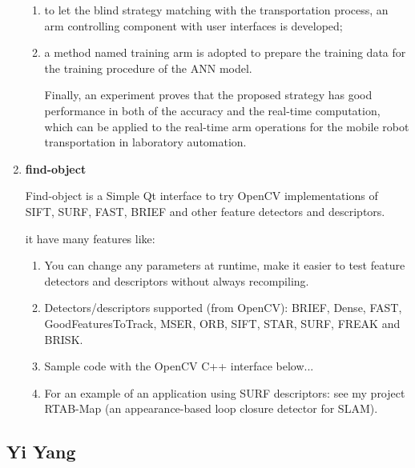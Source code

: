 \documentclass[10pt,twocolumn,letterpaper]{article}
\begin{document}
\begin{enumerate}
\begin{enumerate}
\item to let the blind strategy matching with the transportation process, an arm controlling component with
user interfaces is developed;

\item a method named training arm is adopted to prepare the training data for the training procedure of the ANN model.

Finally, an experiment proves that the proposed strategy has good performance in both of the accuracy and the real-time computation, which can be applied to the real-time arm operations for the mobile robot transportation in laboratory automation.

\end{enumerate}

\item \textbf{find-object}
 
Find-object is a Simple Qt interface to try OpenCV implementations of SIFT, SURF, FAST, BRIEF and other feature detectors and descriptors.

it have many features like:

\begin{enumerate}
\item You can change any parameters at runtime, make it easier to test feature detectors and descriptors without always recompiling.

\item Detectors/descriptors supported (from OpenCV): BRIEF, Dense, FAST, GoodFeaturesToTrack, MSER, ORB, SIFT, STAR, SURF, FREAK and BRISK.

\item Sample code with the OpenCV C++ interface below...

\item For an example of an application using SURF descriptors: see my project RTAB-Map (an appearance-based loop closure detector for SLAM).
\end{enumerate}

\end{enumerate}

\subsection{Yi Yang}
\end{document}
